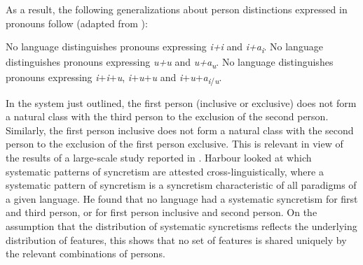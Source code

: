\documentclass[output=paper]{langsci/langscibook}
\begin{document}
As a result, the following generalizations about person distinctions expressed in pronouns follow (adapted from \citealt{Bobaljik2008Missing}):

\ea 
    \ea  No language distinguishes pronouns expressing \textit{i+i} and \textit{i+a\textsubscript{i}}.
    \ex No language distinguishes pronouns expressing \textit{u+u} and \textit{u+a\textsubscript{u}}.
    \ex No language distinguishes pronouns expressing \textit{i}+\textit{i}+\textit{u}, \textit{i}+\textit{u}+\textit{u} and \textit{i}+\textit{u}+\textit{a\textsubscript{i}}\textsubscript{/}\textit{\textsubscript{u}}.
    \z
\z



In the system just outlined, the first person (inclusive or exclusive) does not form a natural class with the third person to the exclusion of the second person. Similarly, the first person inclusive does not form a natural class with the second person to the exclusion of the first person exclusive. This is relevant in view of the results of a large-scale study reported in \citealt{Harbour2016}. Harbour looked at which systematic patterns of syncretism are attested cross-linguistically, where a systematic pattern of syncretism is a syncretism characteristic of all paradigms of a given language. He found that no language had a systematic syncretism for first and third person, or for first person inclusive and second person. On the assumption that the distribution of systematic syncretisms reflects the underlying distribution of features, this shows that no set of features is shared uniquely by the relevant combinations of persons.
\end{document}
